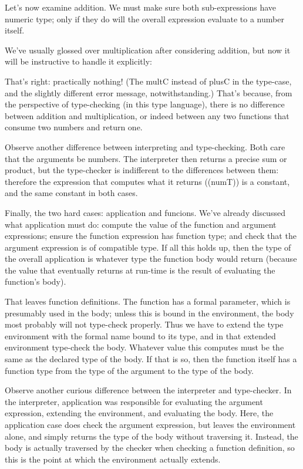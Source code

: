 Let’s now examine addition. We must make sure both sub-expressions have numeric
type; only if they do will the overall expression evaluate to a number itself.

We’ve usually glossed over multiplication after considering addition, but now it
will be instructive to handle it explicitly:


That’s right: practically nothing! (The multC instead of plusC in the type-case,
and the slightly different error message, notwithstanding.) That’s because, from
the perspective of type-checking (in this type language), there is no difference
between addition and multiplication, or indeed between any two functions that
consume two numbers and return one.

Observe another difference between interpreting and type-checking. Both care
that the arguments be numbers. The interpreter then returns a precise sum or
product, but the type-checker is indifferent to the differences between them:
therefore the expression that computes what it returns ((numT)) is a constant,
and the same constant in both cases.

Finally, the two hard cases: application and funcions. We’ve already discussed
what application must do: compute the value of the function and argument
expressions; ensure the function expression has function type; and check that
the argument expression is of compatible type. If all this holds up, then the
type of the overall application is whatever type the function body would return
(because the value that eventually returns at run-time is the result of
evaluating the function’s body).

That leaves function definitions. The function has a formal parameter, which is
presumably used in the body; unless this is bound in the environment, the body
most probably will not type-check properly. Thus we have to extend the type
environment with the formal name bound to its type, and in that extended
environment type-check the body. Whatever value this computes must be the same
as the declared type of the body. If that is so, then the function itself has a
function type from the type of the argument to the type of the body.


Observe another curious difference between the interpreter and type-checker. In
the interpreter, application was responsible for evaluating the argument
expression, extending the environment, and evaluating the body. Here, the
application case does check the argument expression, but leaves the environment
alone, and simply returns the type of the body without traversing it. Instead,
the body is actually traversed by the checker when checking a function
definition, so this is the point at which the environment actually extends.
